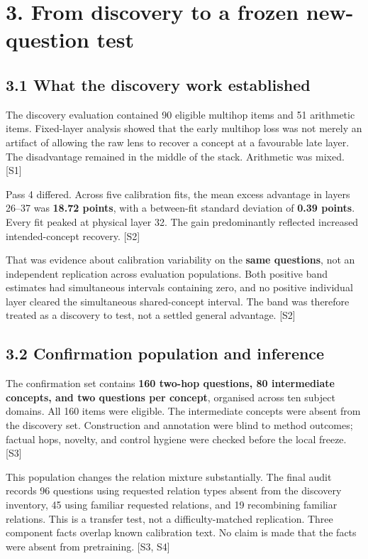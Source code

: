 \documentclass[
  11pt,
  a4paper,
]{article}
\begin{document}
\section{3. From discovery to a frozen new-question
test}\label{from-discovery-to-a-frozen-new-question-test}

\subsection{3.1 What the discovery work
established}\label{what-the-discovery-work-established}

The discovery evaluation contained 90 eligible multihop items and 51
arithmetic items. Fixed-layer analysis showed that the early multihop
loss was not merely an artifact of allowing the raw lens to recover a
concept at a favourable late layer. The disadvantage remained in the
middle of the stack. Arithmetic was mixed. {[}S1{]}

Pass 4 differed. Across five calibration fits, the mean excess advantage
in layers 26--37 was \textbf{18.72 points}, with a between-fit standard
deviation of \textbf{0.39 points}. Every fit peaked at physical layer
32. The gain predominantly reflected increased intended-concept
recovery. {[}S2{]}

That was evidence about calibration variability on the \textbf{same
questions}, not an independent replication across evaluation
populations. Both positive band estimates had simultaneous intervals
containing zero, and no positive individual layer cleared the
simultaneous shared-concept interval. The band was therefore treated as
a discovery to test, not a settled general advantage. {[}S2{]}

\subsection{3.2 Confirmation population and
inference}\label{confirmation-population-and-inference}

The confirmation set contains \textbf{160 two-hop questions, 80
intermediate concepts, and two questions per concept}, organised across
ten subject domains. All 160 items were eligible. The intermediate
concepts were absent from the discovery set. Construction and annotation
were blind to method outcomes; factual hops, novelty, and control
hygiene were checked before the local freeze. {[}S3{]}

This population changes the relation mixture substantially. The final
audit records 96 questions using requested relation types absent from
the discovery inventory, 45 using familiar requested relations, and 19
recombining familiar relations. This is a transfer test, not a
difficulty-matched replication. Three component facts overlap known
calibration text. No claim is made that the facts were absent from
pretraining. {[}S3, S4{]}
\end{document}
